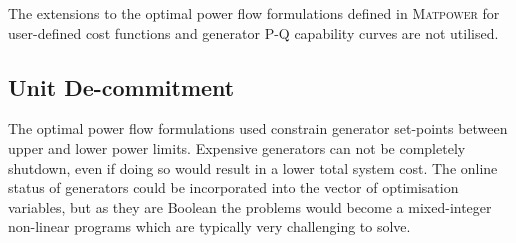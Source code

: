 The extensions to the optimal power flow formulations defined in
\textsc{Matpower} for user-defined cost functions and generator P-Q capability
curves are not utilised.

%

\subsection{Unit De-commitment}
The optimal power flow formulations used constrain generator set-points
between upper and lower power limits.  Expensive generators can not be
completely shutdown, even if doing so would result in a lower total system
cost.  The online status of generators could be incorporated into the vector of
optimisation variables, but as they are Boolean the problems would become a
mixed-integer non-linear programs which are typically very challenging to
solve.

